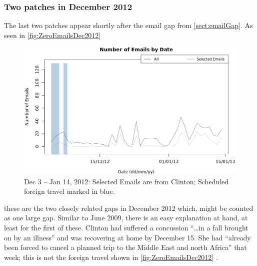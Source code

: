 \documentclass[journal]{vgtc}                %
\begin{document}
\subsubsection{Two patches in December 2012}
The last two patches appear 
shortly after the email gap from \autoref{sect:emailGap}.  As seen in \autoref{fig:ZeroEmailsDec2012}
\begin{figure}[h]
\begin{center}
\includegraphics[width=0.95\linewidth]{ZeroEmailsDec2012}
\caption{Dec 3 -- Jan 14, 2012:  Selected Emails are from Clinton; Scheduled foreign travel marked in blue.}
\label{fig:ZeroEmailsDec2012}
\end{center}
\end{figure}
these are the two closely related gaps in December 2012 which,
might be counted as one large gap.
Similar to June 2009, there is an easy explanation at hand, at least for the first of these.  Clinton had suffered a concussion ``\ldots in a fall brought on by an illness'' \cite{concussion} and was recovering at home by December 15.  She had ``already been forced to cancel a planned trip to the Middle East and north Africa'' \cite{concussion} that week; this is not the foreign travel shown in \autoref{fig:ZeroEmailsDec2012} \cite{ForeignSched}.  
\end{document}
